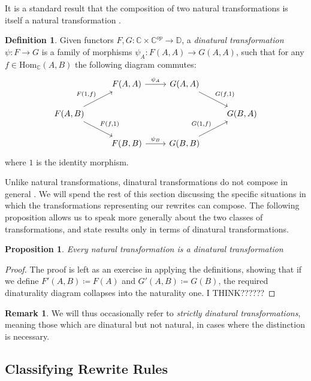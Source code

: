 \documentclass[11pt, oneside]{article}
\theoremstyle{plain}
\newtheorem{proposition}[theorem]{Proposition}
\theoremstyle{definition}
\newtheorem{definition}[theorem]{Definition}
\newtheorem*{remark}{Remark}
\begin{document}
It is a standard result that the composition of two natural transformations is itself a natural transformation \cite{leinster2016basic}.

\begin{definition}
Given functors $F,G:\mathbb{C}\times\mathbb{C}^{op}\to\mathbb{D}$, a \textit{dinatural transformation} $\psi:F\to G$ is a family of morphisms
$\psi_A:F(A,A)\to G(A,A)$, such that for any $f\in\text{Hom}_{\mathbb{C}}(A,B)$ the following diagram commutes:
\[
\begin{tikzcd}
    & F(A,A) \arrow[r,"\psi_A"] & G(A,A) \arrow[rd,"{G(f,1)}"] \\
    F(A,B) \arrow[ru,"{F(1,f)}"] \arrow[rd,"{F(f,1)}"] &&& G(B,A) \\
    & F(B,B) \arrow[r,"\psi_B"] & G(B,B) \arrow[ru,"{G(1,f)}"]
\end{tikzcd}
\]
where $1$ is the identity morphism.
\end{definition}

Unlike natural transformations, dinatural transformations do not compose in general \cite{mccusker2018compositionality}.
We will spend the rest of this section discussing the specific situations in which the transformations representing our rewrites can compose.
The following proposition allows us to speak more generally about the two classes of transformations, and state results only in terms of dinatural transformations.

\begin{proposition}
Every natural transformation is a dinatural transformation
\end{proposition}

\begin{proof}
The proof is left as an exercise in applying the definitions, showing that if we define $F'(A,B) \coloneq F(A)$ and $G'(A,B) \coloneq G(B)$, the required dinaturality diagram collapses into the naturality one.
I THINK??????
\end{proof}

\begin{remark}
We will thus occasionally refer to \textit{strictly dinatural transformations}, meaning those which are dinatural but not natural, in cases where the distinction is necessary.
\end{remark}

\subsection{Classifying Rewrite Rules}
\end{document}
